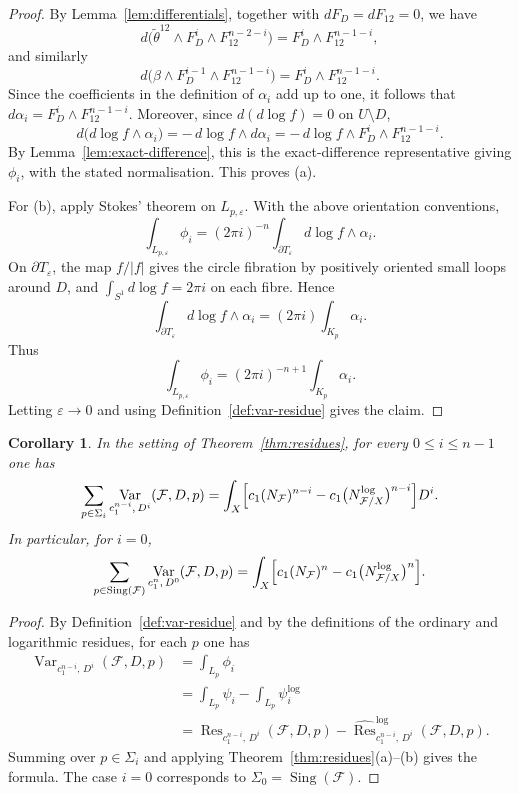 \documentclass[12pt,reqno,a4paper]{amsart}
\numberwithin{equation}{section}
\theoremstyle{plain}
\newtheorem{corollary}[corollary]{Corollary}
\theoremstyle{definition}
\DeclareMathOperator{\Sing}{Sing}
\DeclareMathOperator{\Var}{Var}
\newcommand{\cF}{\mathcal{F}}
\begin{document}
\begin{proof}
By Lemma~\ref{lem:differentials}, together with \(dF_D=dF_{12}=0\), we have
\[
d\bigl(\widetilde{\theta}^{12}\wedge F_D^i\wedge F_{12}^{n-2-i}\bigr)
=
F_D^i\wedge F_{12}^{n-1-i},
\]
and similarly
\[
d\bigl(\beta\wedge F_D^{i-1}\wedge F_{12}^{n-1-i}\bigr)
=
F_D^i\wedge F_{12}^{n-1-i}.
\]
Since the coefficients in the definition of \(\alpha_i\) add up to one, it
follows that \(d\alpha_i=F_D^i\wedge F_{12}^{n-1-i}\). Moreover, since
\(d(d\log f)=0\) on \(U\setminus D\),
\[
d\bigl(d\log f\wedge\alpha_i\bigr)
=
-\,d\log f\wedge d\alpha_i
=
-\,d\log f\wedge F_D^i\wedge F_{12}^{n-1-i}.
\]
By Lemma~\ref{lem:exact-difference}, this is the exact-difference representative
giving \(\phi_i\), with the stated normalisation. This proves \textup{(a)}.

For \textup{(b)}, apply Stokes' theorem on \(L_{p,\varepsilon}\). With the
above orientation conventions,
\[
\int_{L_{p,\varepsilon}}\phi_i
=
(2\pi i)^{-n}
\int_{\partial T_\varepsilon}d\log f\wedge\alpha_i.
\]
On \(\partial T_\varepsilon\), the map \(f/|f|\) gives the circle fibration by
positively oriented small loops around \(D\), and
$
\int_{S^1}d\log f=2\pi i
$
on each fibre. Hence
\[
\int_{\partial T_\varepsilon}d\log f\wedge\alpha_i
=
(2\pi i)\int_{K_p}\alpha_i.
\]
Thus
\[
\int_{L_{p,\varepsilon}}\phi_i
=
(2\pi i)^{-n+1}\int_{K_p}\alpha_i.
\]
Letting \(\varepsilon\to 0\) and using Definition~\ref{def:var-residue} gives
the claim.
\end{proof}

\begin{corollary} \label{cor:global-var}
In the setting of Theorem~\ref{thm:residues}, for every \(0\leq i\leq n-1\)
one has
\[
\sum_{p\in \Sigma_i}
\Var_{c_1^{n-i},\,D^i}(\cF,D,p)
=
\int_X
\Bigl[
c_1(N_{\cF})^{n-i}
-
c_1\bigl(N^{\log}_{\cF/X}\bigr)^{n-i}
\Bigr]D^i.
\]
In particular, for \(i=0\),
\[
\sum_{p\in \Sing(\cF)}
\Var_{c_1^n,\,D^0}(\cF,D,p)
=
\int_X
\Bigl[
c_1(N_{\cF})^n
-
c_1\bigl(N^{\log}_{\cF/X}\bigr)^n
\Bigr].
\]
\end{corollary}

\begin{proof}
By Definition~\ref{def:var-residue} and by the definitions of the ordinary and
logarithmic residues, for each \(p\) one has
\[
\begin{aligned}
\Var_{c_1^{n-i},\,D^i}(\cF,D,p)
&=
\int_{L_p}\phi_i \\
&=
\int_{L_p}\psi_i-\int_{L_p}\psi_i^{\log} \\
&=
\operatorname{Res}_{c_1^{n-i},\,D^i}(\cF,D,p)
-
\widehat{\operatorname{Res}}^{\log}_{c_1^{n-i},\,D^i}(\cF,D,p).
\end{aligned}
\]
Summing over \(p\in\Sigma_i\) and applying
Theorem~\ref{thm:residues}\textup{(a)}--\textup{(b)} gives the formula. The case
\(i=0\) corresponds to \(\Sigma_0=\Sing(\cF)\).
\end{proof}
\end{document}
